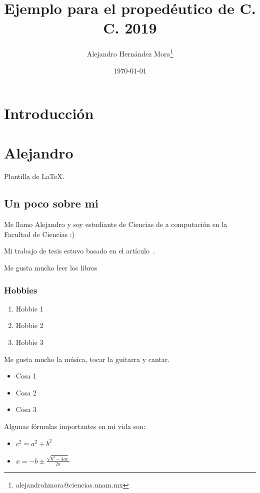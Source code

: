 \documentclass{book}
\author{Alejandro Hernández Mora\thanks{alejandrohmora@ciencias.unam.mx}}
\title{Ejemplo para el propedéutico de C. C. 2019}
\date{\today}
\begin{document}
\maketitle
\tableofcontents
{}

\listoffigures
{}

\listoftables
{}

\chapter*{Introducción}

\chapter{Alejandro}

Plantilla de \large{\LaTeX.}
\section{Un poco sobre mi}
Me llamo Alejandro y soy estudiante de Ciencias de a computación en la Facultad de Ciencias :)

Mi trabajo de tesis estuvo basado en el artículo~\cite{Floodlight}.

Me gusta mucho leer los libros~\cite{torres,comunidad,retorno}

\subsection{Hobbies}
\begin{enumerate}
\item Hobbie 1
\item Hobbie 2
\item Hobbie 3
\end{enumerate}
Me gusta mucho la música, tocar la guitarra y cantar.

\begin{itemize}
\item Cosa 1
\item Cosa 2
\item Cosa 3
\end{itemize}

\newpage
Algunas fórmulas importantes en mi vida son:
\begin{itemize}
\item $c^2 = a^2 + b^2$
\item $x=-b \pm \frac{\sqrt{b^2-4ac}}{2a}$
\end{itemize}
\end{document}
